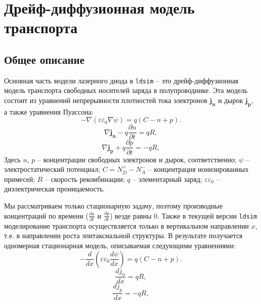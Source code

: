 \documentclass{article}
\newcommand{\ldsim}{\texttt{ldsim}}
\begin{document}
\section{Дрейф-диффузионная модель транспорта} 

\subsection{Общее описание}
Основная часть модели лазерного диода в \ldsim{} -- это дрейф-диффузионная
модель транспорта свободных носителей заряда в полупроводнике. Эта модель
состоит из уравнений непрерывности плотностей тока электронов $\mathbf{j_n}$
и дырок $\mathbf{j_p}$, а также уравнения Пуассона:
\begin{equation*}
	-\nabla{\left( \varepsilon\varepsilon_0  \nabla \psi \right)} =
    q \left( C - n + p \right).
\end{equation*}
\begin{equation*}
	\nabla{}\mathbf{j_n} - q\frac{\partial{n}}{\partial{t}} = qR,
\end{equation*}
\begin{equation*}
	\nabla{}\mathbf{j_p} + q\frac{\partial{p}}{\partial{t}} = -qR,
\end{equation*}
Здесь $n$, $p$ -- концентрации свободных электронов и дырок, соответственно;
$\psi$ -- электростатический потенциал;
$C = N_D^+ - N_A^-$ -- концентрация ионизированных примесей;
$R$ -- скорость рекомбинации; 
$q$ -- элементарный заряд;
$\varepsilon\varepsilon_0$ -- диэлектрическая проницаемость.

Мы рассматриваем только стационарную задачу, поэтому производные концентраций
по времени ($\frac{\partial n}{\partial t}$ и $\frac{\partial p}{\partial t}$)
везде равны $0$. Также в текущей версии \ldsim{} моделирование транспорта
осуществляется только в вертикальном направлении $x$, т.е. в направлении роста
эпитаксиальной структуры. В результате получается одномерная стационарная модель,
описываемая следующими уравнениями:
\begin{equation}
    \label{eq:poisson}
    -\frac{d}{dx}
    {\left( \varepsilon\varepsilon_0  \frac{d\psi}{dx} \right)} =
    q \left( C - n + p \right).
\end{equation}
\begin{equation}
    \label{eq:jn_cont}
    \frac{dj_n}{dx} = qR,
\end{equation}
\begin{equation}
    \frac{dj_p}{dx} = -qR,
    \label{eq:jp_cont}
\end{equation}
\end{document}
